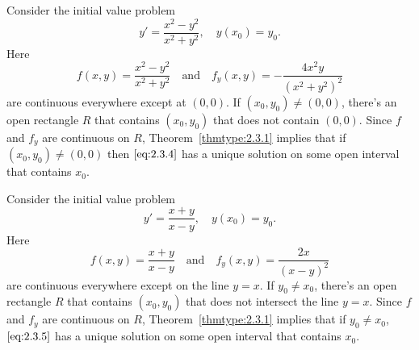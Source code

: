 \documentclass{ximera}
\begin{document}
\begin{example}\label{example:2.3.2}
Consider  the initial value problem
\begin{equation} \label{eq:2.3.4}
y'=\frac{x^2-y^2}{x^2+y^2}, \quad y(x_0)=y_0.
\end{equation}
Here
$$
f(x,y)  =  \frac{x^2-y^2}{x^2+y^2} \quad\mbox{and}\quad 
f_y(x,y)  =  -\frac{4x^2y}{(x^2+y^2)^2}
$$
are continuous everywhere except at $(0,0)$. If $(x_0,y_0)
\neq(0,0)$, there's an open rectangle $R$ that contains
$(x_0,y_0)$ that does not contain $(0,0)$. Since $f$ and $f_y$ are
continuous on $R$, Theorem~\ref{thmtype:2.3.1} implies that if
$(x_0,y_0)\neq(0,0)$ then
$\eqref{eq:2.3.4}$
has a unique solution on some open interval that contains $x_0$.
\end{example}

\begin{example}\label{example:2.3.3}
Consider the initial value problem
\begin{equation} \label{eq:2.3.5}
y'=\frac{x+y}{x-y},\quad y(x_0)=y_0.
\end{equation}
Here
$$
f(x,y)  =  \frac{x+y}{x-y} \quad\mbox{and}\quad 
f_y(x,y)  =  \frac{2x}{(x-y)^2}
$$
are continuous everywhere except on the line $y=x$. If $y_0\neq x_0$,
there's an open rectangle $R$ that contains $(x_0,y_0)$ that
does not intersect the line $y=x$. Since $f$ and $f_y$ are continuous
on $R$, Theorem~\ref{thmtype:2.3.1} implies that if $y_0\neq x_0$,
$\eqref{eq:2.3.5}$ has a unique solution on some open interval that contains
$x_0$.
\end{example}
\end{document}
